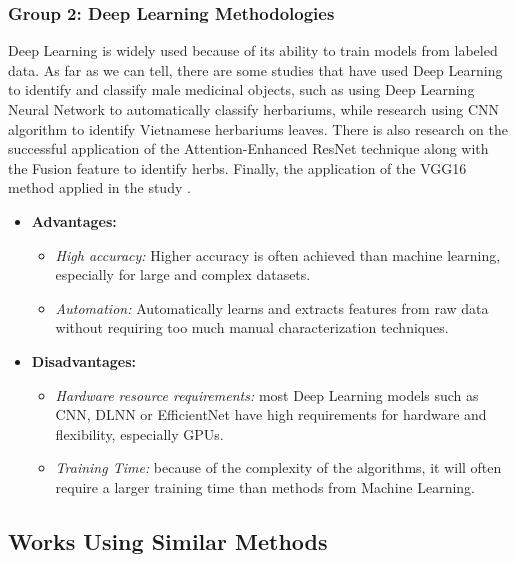\documentclass[conference]{IEEEtran}
\begin{document}
\subsubsection{Group 2: Deep Learning Methodologies}
Deep Learning is widely used because of its ability to train models from labeled data. As far as we can tell, there are some studies that have used Deep Learning to identify and classify male medicinal objects, such as using Deep Learning Neural Network\cite{r3} to automatically classify herbariums, while research using CNN algorithm \cite{r4} to identify Vietnamese herbariums leaves. There is also research \cite{A1} on the successful application of the Attention-Enhanced ResNet technique along with the Fusion feature to identify herbs. Finally, the application of the VGG16 method applied in the study \cite{A2}.

\begin{itemize}
    \item \textbf{Advantages:}
    \begin{itemize}
        \item \textit{High accuracy:} Higher accuracy is often achieved than machine learning, especially for large and complex datasets. 
        \item \textit{Automation:} Automatically learns and extracts features from raw data without requiring too much manual characterization techniques.
       
    \end{itemize}
    \item \textbf{Disadvantages:}
    \begin{itemize}
        \item \textit{Hardware resource requirements:} most Deep Learning models such as CNN, DLNN or EfficientNet have high requirements for hardware and flexibility, especially GPUs.
        \item \textit{Training Time:} because of the complexity of the algorithms, it will often require a larger training time than methods from Machine Learning.
        
    \end{itemize}
\end{itemize}

\subsection{Works Using Similar Methods}
\end{document}
